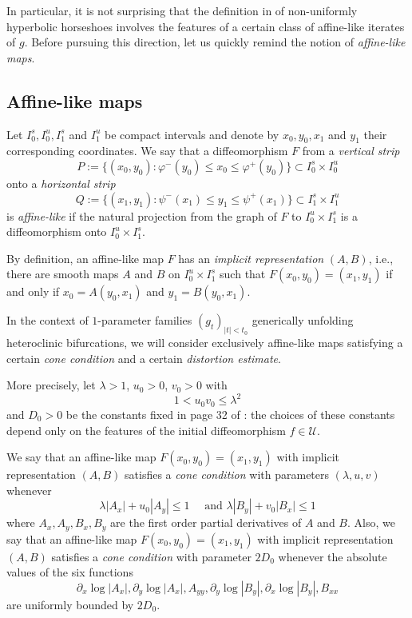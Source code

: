 \documentclass[12pt]{amsart}
\numberwithin{equation}{section}
\theoremstyle{definition}
\newcommand{\<}{{\langle}}
\renewcommand{\>}{{\rangle}}
\begin{document}
In particular, it is not surprising that the definition in \cite{PY09} of non-uniformly hyperbolic horseshoes involves the features of a certain class of affine-like iterates of $g$. Before pursuing this direction, let us quickly remind the notion of \emph{affine-like maps}. 

\subsection{Affine-like maps} Let $I_0^s, I_0^u, I_1^s$ and $I_1^u$ be compact intervals and denote by $x_0,y_0, x_1$ and $y_1$ their corresponding coordinates. We say that a diffeomorphism $F$ from a \emph{vertical strip}
$$P:=\{(x_0,y_0):\varphi^-(y_0)\leq x_0\leq\varphi^+(y_0)\}\subset I_0^s\times I_0^u$$
onto a \emph{horizontal strip}
$$Q:=\{(x_1,y_1): \psi^-(x_1)\leq y_1\leq \psi^+(x_1)\}\subset I_1^s\times I_1^u$$
is \emph{affine-like} if the natural projection from the graph of $F$ to $I_0^u\times I_1^s$ is a diffeomorphism onto $I_0^u\times I_1^s$. 

By definition, an affine-like map $F$ has an \emph{implicit representation} $(A,B)$, i.e., there are smooth maps $A$ and $B$ on $I_0^u\times I_1^s$ such that $F(x_0,y_0)=(x_1,y_1)$ if and only if $x_0=A(y_0,x_1)$ and $y_1=B(y_0,x_1)$. 

In the context of $1$-parameter families $(g_t)_{|t|<t_0}$ generically unfolding heteroclinic bifurcations, we will consider exclusively affine-like maps satisfying a certain \emph{cone condition} and a certain \emph{distortion estimate}. 

More precisely, let $\lambda>1$, $u_0>0$, $v_0>0$ with 
$$1<u_0v_0\leq\lambda^2$$
and $D_0>0$ be the constants fixed in page 32 of \cite{PY09}: the choices of these constants depend only on the features of the initial diffeomorphism $f\in\mathcal{U}$.  

We say that an affine-like map $F(x_0,y_0)=(x_1,y_1)$ with implicit representation $(A,B)$ satisfies a \emph{cone condition} with parameters $(\lambda, u, v)$ whenever 
$$\lambda|A_x|+u_0|A_y|\leq 1 \quad \textrm{ and } \lambda|B_y|+v_0|B_x|\leq 1$$
where $A_x, A_y, B_x, B_y$ are the first order partial derivatives of $A$ and $B$. Also, we say that an affine-like map $F(x_0,y_0)=(x_1,y_1)$ with implicit representation $(A,B)$ satisfies a \emph{cone condition} with parameter $2D_0$ whenever the absolute values of the six functions
$$\partial_x\log|A_x|, \partial_y\log|A_x|, A_{yy}, \partial_y\log|B_y|, \partial_x\log|B_y|, B_{xx}$$
are uniformly bounded by $2D_0$. 
\end{document}
